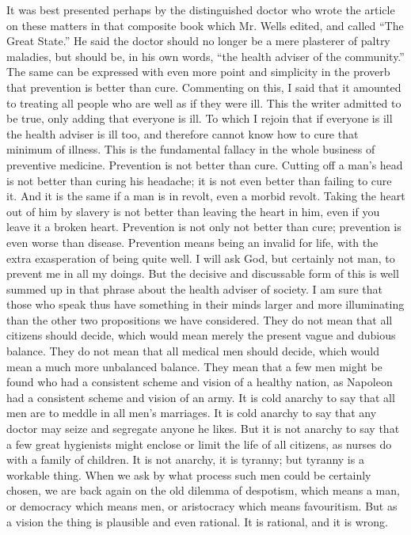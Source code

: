 \documentclass{book}
\begin{document}
It was best presented perhaps by the distinguished doctor who wrote the article on these matters in that composite book which Mr. Wells edited, and called “The Great State.” He said the doctor should no longer be a mere plasterer of paltry maladies, but should be, in his own words, “the health adviser of the community.” The same can be expressed with even more point and simplicity in the proverb that prevention is better than cure. Commenting on this, I said that it amounted to treating all people who are well as if they were ill. This the writer admitted to be true, only adding that everyone is ill. To which I rejoin that if everyone is ill the health adviser is ill too, and therefore cannot know how to cure that minimum of illness. This is the fundamental fallacy in the whole business of preventive medicine. Prevention is not better than cure. Cutting off a man’s head is not better than curing his headache; it is not even better than failing to cure it. And it is the same if a man is in revolt, even a morbid revolt. Taking the heart out of him by slavery is not better than leaving the heart in him, even if you leave it a broken heart. Prevention is not only not better than cure; prevention is even worse than disease. Prevention means being an invalid for life, with the extra exasperation of being quite well. I will ask God, but certainly not man, to prevent me in all my doings. But the decisive and discussable form of this is well summed up in that phrase about the health adviser of society. I am sure that those who speak thus have something in their minds larger and more illuminating than the other two propositions we have considered. They do not mean that all citizens should decide, which would mean merely the present vague and dubious balance. They do not mean that all medical men should decide, which would mean a much more unbalanced balance. They mean that a few men might be found who had a consistent scheme and vision of a healthy nation, as Napoleon had a consistent scheme and vision of an army. It is cold anarchy to say that all men are to meddle in all men’s marriages. It is cold anarchy to say that any doctor may seize and segregate anyone he likes. But it is not anarchy to say that a few great hygienists might enclose or limit the life of all citizens, as nurses do with a family of children. It is not anarchy, it is tyranny; but tyranny is a workable thing. When we ask by what process such men could be certainly chosen, we are back again on the old dilemma of despotism, which means a man, or democracy which means men, or aristocracy which means favouritism. But as a vision the thing is plausible and even rational. It is rational, and it is wrong.
\end{document}
